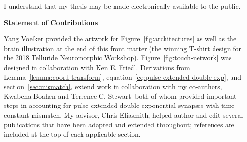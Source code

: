 \bigskip

\noindent
I understand that my thesis may be made electronically available to
the public.

\cleardoublepage

\begin{center}\textbf{Statement of Contributions}\end{center}

\noindent
Yang Voelker provided the artwork for Figure~\ref{fig:architectures} as well as the brain illustration at the end of this front matter (the winning T-shirt design for the 2018 Telluride Neuromorphic Workshop).
Figure~\ref{fig:touch-network} was designed in collaboration with Ken E. Friedl.
Derivations from Lemma~\ref{lemma:coord-transform}, equation~\ref{eq:pulse-extended-double-exp}, and section~\ref{sec:mismatch}, extend work in collaboration with my co-authors, Kwabena Boahen and Terrence C. Stewart, both of whom provided important steps in accounting for pulse-extended double-exponential synapses with time-constant mismatch.
My advisor, Chris Eliasmith, helped author and edit several publications that have been adapted and extended throughout; references are included at the top of each applicable section.

\cleardoublepage
